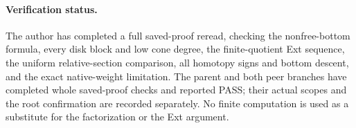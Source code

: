 \paragraph{Verification status.}
The author has completed a full saved-proof reread, checking the
nonfree-bottom formula, every disk block and low cone degree,
the finite-quotient Ext sequence, the uniform relative-section
comparison, all homotopy signs and bottom descent, and the exact
native-weight limitation.  The parent and both peer branches have completed whole saved-proof
checks and reported PASS; their actual scopes and the root
confirmation are recorded separately.  No finite computation is used as a
substitute for the factorization or the Ext argument.
